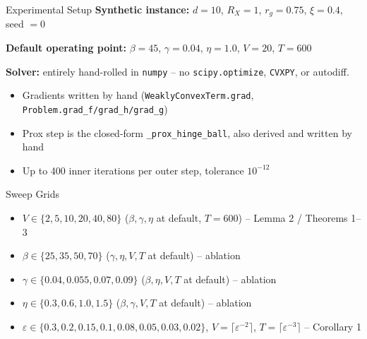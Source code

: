 \documentclass{beamer}
\begin{document}
\begin{frame}{Experimental Setup}
  \textbf{Synthetic instance:} $d=10$, $R_X=1$, $r_g=0.75$, $\xi=0.4$, seed $=0$

  \vspace{0.5em}
  \textbf{Default operating point:} $\beta=45$, $\gamma=0.04$, $\eta=1.0$, $V=20$, $T=600$

  \vspace{0.5em}
  \textbf{Solver:} entirely hand-rolled in \texttt{numpy} -- no \texttt{scipy.optimize}, \texttt{CVXPY}, or autodiff.
  \begin{itemize}
    \item Gradients written by hand (\texttt{WeaklyConvexTerm.grad}, \texttt{Problem.grad\_f/grad\_h/grad\_g})
    \item Prox step is the closed-form \texttt{\_prox\_hinge\_ball}, also derived and written by hand
    \item Up to 400 inner iterations per outer step, tolerance $10^{-12}$
  \end{itemize}
\end{frame}

\begin{frame}{Sweep Grids}
  \begin{itemize}
    \item $V \in \{2, 5, 10, 20, 40, 80\}$ \quad ($\beta,\gamma,\eta$ at default, $T=600$) -- Lemma 2 / Theorems 1--3
    \item $\beta \in \{25, 35, 50, 70\}$ \quad ($\gamma,\eta,V,T$ at default) -- ablation
    \item $\gamma \in \{0.04, 0.055, 0.07, 0.09\}$ \quad ($\beta,\eta,V,T$ at default) -- ablation
    \item $\eta \in \{0.3, 0.6, 1.0, 1.5\}$ \quad ($\beta,\gamma,V,T$ at default) -- ablation
    \item $\varepsilon \in \{0.3, 0.2, 0.15, 0.1, 0.08, 0.05, 0.03, 0.02\}$, $V=\lceil\varepsilon^{-2}\rceil$, $T=\lceil\varepsilon^{-3}\rceil$ -- Corollary 1
  \end{itemize}
\end{frame}
\end{document}

